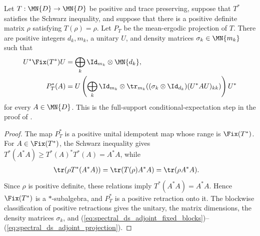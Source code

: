 \begin{theorem}%
    \label{thm:adjoint_mean_ergodic_projection_weighted_block_form}
    \leanok
    Let $T:\MN{D}\to\MN{D}$ be positive and trace preserving, suppose that
    $T^*$ satisfies the Schwarz inequality, and suppose that there is a
    positive definite matrix $\rho$ satisfying $T(\rho)=\rho$. Let $P_T$ be
    the mean-ergodic projection of $T$. There are positive integers
    $d_k,m_k$, a unitary $U$, and density matrices
    $\sigma_k\in\MN{m_k}$ such that
    \begin{align}
        U^*\Fix(T^*)U
         & =\bigoplus_k\Id_{m_k}\otimes\MN{d_k},
        \label{eq:spectral_ds_adjoint_fixed_blocks}                                   \\
        P_T^*(A)
         & =U\left(\bigoplus_k\Id_{m_k}\otimes
             \tr_{m_k}\!\left((\sigma_k\otimes\Id_{d_k})(U^*AU)_{kk}\right)\right)U^*
        \label{eq:spectral_ds_adjoint_projection}
    \end{align}
    for every $A\in\MN{D}$. This is the full-support
    conditional-expectation step in the proof of
    \cite[Theorem~6.14]{Wolf2012Quantum}.
\end{theorem}

\begin{proof}
    \leanok
    The map $P_T^*$ is a positive unital idempotent map whose range is
    $\Fix(T^*)$. For $A\in\Fix(T^*)$, the Schwarz inequality gives
    $T^*(A^*A)\geq T^*(A)^*T^*(A)=A^*A$, while
    \begin{align}
        \tr\!\left(\rho T^*(A^*A)\right)
         & =\tr\!\left(T(\rho)A^*A\right)
        =\tr(\rho A^*A).
        \notag
    \end{align}
    Since $\rho$ is positive definite, these relations imply
    $T^*(A^*A)=A^*A$. Hence $\Fix(T^*)$ is a $*$-subalgebra, and $P_T^*$ is
    a positive retraction onto it. The blockwise classification of positive
    retractions gives the unitary, the matrix dimensions, the density
    matrices $\sigma_k$, and
    (\ref{eq:spectral_ds_adjoint_fixed_blocks})--%
    (\ref{eq:spectral_ds_adjoint_projection}).
\end{proof}

